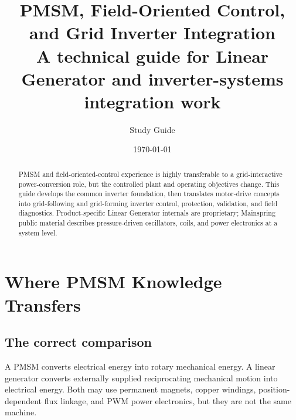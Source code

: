 \documentclass[11pt]{article}
\title{\textbf{PMSM, Field-Oriented Control, and Grid Inverter Integration}\\\large A technical guide for Linear Generator and inverter-systems integration work}
\author{Study Guide}
\date{\today}
\begin{document}
\maketitle
\begin{abstract}
PMSM and field-oriented-control experience is highly transferable to a grid-interactive power-conversion role, but the controlled plant and operating objectives change. This guide develops the common inverter foundation, then translates motor-drive concepts into grid-following and grid-forming inverter control, protection, validation, and field diagnostics. Product-specific Linear Generator internals are proprietary; Mainspring public material describes pressure-driven oscillators, coils, and power electronics at a system level.
\end{abstract}
\tableofcontents
\newpage

\section{Where PMSM Knowledge Transfers}
\subsection{The correct comparison}
A PMSM converts electrical energy into rotary mechanical energy. A linear generator converts externally supplied reciprocating mechanical motion into electrical energy. Both may use permanent magnets, copper windings, position-dependent flux linkage, and PWM power electronics, but they are not the same machine.

\begin{center}
\end{center}
\end{document}
